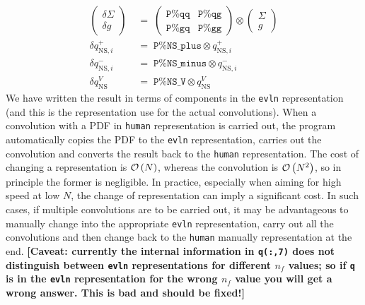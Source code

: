 \documentclass[12pt]{article}
\newcommand{\comment}[1]{\textbf{[#1]}}
\newcommand{\ttt}[1]{\texttt{#1}}
\newcommand{\order}[1]{{\cal O}\left(#1\right)}
\begin{document}
\begin{align}
  \label{eq:Pmat_on_q}
  \left(\!\!
    \begin{array}{c}
      \delta\Sigma\\
       \delta g
    \end{array}
  \!\!\right)
    \;&= \;
  \left(
    \begin{array}{cc}
      \ttt{P\%qq} & \ttt{P\%qg}\\
      \ttt{P\%gq} & \ttt{P\%gg}
    \end{array}
  \right) 
  \otimes
  \left(\!\!
    \begin{array}{c}
      \Sigma\\
       g
    \end{array}
    \!\!\right) 
  \nonumber\\[3pt]
%
  \delta q^+_{\mathrm{NS},i} \;&=\; \ttt{P\%NS\_plus} \otimes
  q^+_{\mathrm{NS},i}\\[3pt] 
%
  \delta q^-_{\mathrm{NS},i} \;&=\; \ttt{P\%NS\_minus} \otimes
  q^-_{\mathrm{NS},i}\nonumber \\[3pt]
% 
  \delta q^V_{\mathrm{NS}} \;&=\; \ttt{P\%NS\_V} \otimes
  q^V_{\mathrm{NS}} \nonumber
\end{align}
We have written the result in terms of components in the \ttt{evln}
representation (and this is the representation use for the actual
convolutions). When a convolution with a PDF in \ttt{human}
representation is carried out, the program automatically copies the
PDF to the \ttt{evln} representation, carries out the convolution and
converts the result back to the \ttt{human} representation.
%
The cost of changing a representation is $\order{N}$, whereas the
convolution is $\order{N^2}$, so in principle the former is
negligible. In practice, especially when aiming for high speed at low
$N$, the change of representation can imply a significant cost. In
such cases, if multiple convolutions are to be carried out, it may be
advantageous to manually change into the appropriate \ttt{evln}
representation, carry out all the convolutions and then change back to
the \ttt{human} manually representation at the end.
%
\comment{Caveat: currently the internal information in \ttt{q(:,7)}
  does not distinguish between \ttt{evln} representations for
  different $n_f$ values; so if \ttt{q} is in the \ttt{evln}
  representation for the wrong $n_f$ value you will get a wrong
  answer. This is bad and should be fixed!}
\end{document}
